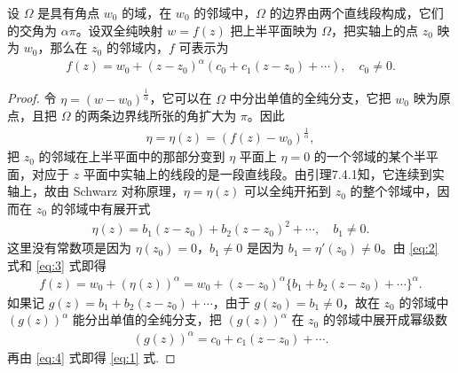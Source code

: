\documentclass[../../main.tex]{subfiles}%
\begin{document}
\begin{lemma}\label{lemma:复变引理7.4.2}
设 \(\Omega\) 是具有角点 \(w_0\) 的域，在 \(w_0\) 的邻域中，\(\Omega\) 的边界由两个直线段构成，它们的交角为 \(\alpha\pi\)。设双全纯映射 \(w=f(z)\) 把上半平面映为 \(\Omega\)，把实轴上的点 \(z_0\) 映为 \(w_0\)，那么在 \(z_0\) 的邻域内，\(f\) 可表示为
\begin{align}
f(z) = w_0 + (z-z_0)^\alpha (c_0 + c_1(z-z_0) + \cdots), \quad c_0 \neq 0. \label{eq:1}
\end{align}
\end{lemma}
\begin{proof}
令 \(\eta=(w-w_0)^{\frac{1}{\alpha}}\)，它可以在 \(\Omega\) 中分出单值的全纯分支，它把 \(w_0\) 映为原点，且把 \(\Omega\) 的两条边界线所张的角扩大为 \(\pi\)。因此
\begin{align}
\eta = \eta(z) = (f(z)-w_0)^{\frac{1}{\alpha}}, \label{eq:2}
\end{align}
把 \(z_0\) 的邻域在上半平面中的那部分变到 \(\eta\) 平面上 \(\eta=0\) 的一个邻域的某个半平面，对应于 \(z\) 平面中实轴上的线段的是一段直线段。由引理7.4.1知，它连续到实轴上，故由 Schwarz 对称原理，\(\eta=\eta(z)\) 可以全纯开拓到 \(z_0\) 的整个邻域中，因而在 \(z_0\) 的邻域中有展开式
\begin{align}
\eta(z) = b_1(z-z_0) + b_2(z-z_0)^2 + \cdots, \quad b_1 \neq 0. \label{eq:3}
\end{align}
这里没有常数项是因为 \(\eta(z_0)=0\)，\(b_1 \neq 0\) 是因为 \(b_1=\eta'(z_0) \neq 0\)。由 \eqref{eq:2} 式和 \eqref{eq:3} 式即得
\begin{align}
f(z) = w_0 + (\eta(z))^\alpha 
= w_0 + (z-z_0)^\alpha \{ b_1 + b_2(z-z_0) + \cdots \}^\alpha. \label{eq:4}
\end{align}
如果记 \(g(z)=b_1+b_2(z-z_0)+\cdots\)，由于 \(g(z_0)=b_1 \neq 0\)，故在 \(z_0\) 的邻域中 \((g(z))^\alpha\) 能分出单值的全纯分支，把 \((g(z))^\alpha\) 在 \(z_0\) 的邻域中展开成幂级数
\begin{align*}
(g(z))^\alpha = c_0 + c_1(z-z_0) + \cdots.
\end{align*}
再由 \eqref{eq:4} 式即得 \eqref{eq:1} 式.
\end{proof}
\end{document}
